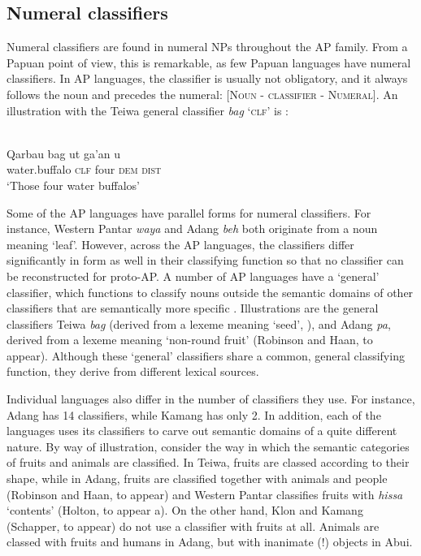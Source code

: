 \subsection{Numeral classifiers}\label{sec:1:6.3}
Numeral classifiers are found in numeral NPs throughout the AP family. From a Papuan point of view, this is remarkable, as few Papuan languages have numeral classifiers. In AP languages, the classifier is usually not obligatory, and it always follows the noun and precedes the numeral: \textsc{[Noun - classifier - Numeral]. A}n illustration with the Teiwa general classifier \textit{bag} `\textsc{clf}' is :



\ea%
\label{ex:1:35}
 \\
\gll Qarbau   bag   ut   ga'an   u \\
 water.buffalo  \textsc{clf}  four  \textsc{dem}  \textsc{dist}  \\
\glt `Those four water buffalos'   
\z 



         

Some of the AP languages have parallel forms for numeral classifiers. For instance, Western Pantar \textit{waya} and Adang \textit{beh} both originate from a noun meaning `leaf'. However, across the AP languages, the classifiers differ significantly in form as well in their classifying function so that no classifier can be reconstructed for proto-AP. A number of AP languages have a `general' classifier, which functions to classify nouns outside the semantic domains of other classifiers that are semantically more specific \citep[cf.][]{ZubinEtAl1993}. Illustrations are the general classifiers Teiwa \textit{bag} (derived from a lexeme meaning `seed', \citealt{Klamer2014,Klamertanumeral}), and Adang \textit{pa{\textglotstop}}, derived from a lexeme meaning `non-round fruit' (Robinson and Haan, to appear). Although these `general' classifiers share a common, general classifying function, they derive from different lexical sources.

Individual languages also differ in the number of classifiers they use. For instance, Adang has 14 classifiers, while Kamang has only 2.  In addition, each of the languages uses its classifiers to carve out semantic domains of a quite different nature. By way of illustration, consider the way in which the semantic categories of fruits and animals are classified. In Teiwa, fruits are classed according to their shape, while in Adang, fruits are classified together with animals and people (Robinson and Haan, to appear) and Western Pantar classifies fruits with \textit{hissa} `contents' (Holton, to appear a). On the other hand, Klon \citep{Baird2008} and Kamang (Schapper, to appear) do not use a classifier with fruits at all. Animals are classed with fruits and humans in Adang, but with inanimate (!) objects in Abui. 

